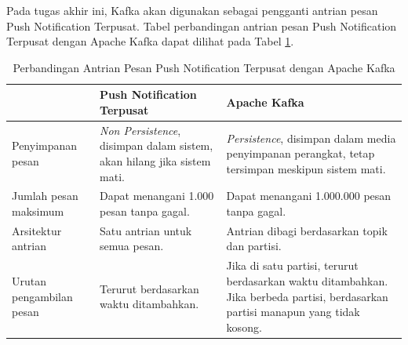 \par Pada tugas akhir ini, Kafka akan digunakan sebagai pengganti antrian pesan Push Notification Terpusat. Tabel perbandingan antrian pesan Push Notification Terpusat dengan Apache Kafka dapat dilihat pada Tabel \ref{t:perbandingan_kafka}.
\begin{longtable}{|p{2.5cm}|p{3.5cm}|p{3.5cm}|}
	\caption{Perbandingan Antrian Pesan Push Notification Terpusat dengan Apache Kafka} \label{t:perbandingan_kafka} \\ \hline
	\rowcolor{lightgray} & Push Notification Terpusat & Apache Kafka \\ \hline
	Penyimpanan pesan & \textit{Non Persistence}, disimpan dalam sistem, akan hilang jika sistem mati. & \textit{Persistence}, disimpan dalam media penyimpanan perangkat, tetap tersimpan meskipun sistem mati. \\ \hline
	Jumlah pesan maksimum & Dapat menangani 1.000 pesan tanpa gagal. & Dapat menangani 1.000.000 pesan tanpa gagal. \\ \hline
	Arsitektur antrian & Satu antrian untuk semua pesan. & Antrian dibagi berdasarkan topik dan partisi. \\ \hline
	Urutan pengambilan pesan & Terurut berdasarkan waktu ditambahkan. & Jika di satu partisi, terurut berdasarkan waktu ditambahkan. Jika berbeda partisi, berdasarkan partisi manapun yang tidak kosong. \\ \hline
\end{longtable}


